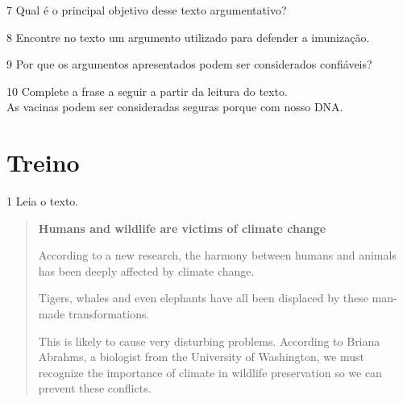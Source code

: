 \num{7} Qual é o principal objetivo desse texto argumentativo?



\num{8} Encontre no texto um argumento utilizado para defender a
imunização.



\num{9} Por que os argumentos apresentados podem ser considerados
confiáveis?



\num{10} Complete a frase a seguir a partir da leitura do texto.\\
As vacinas podem ser consideradas seguras porque \preencher com nosso DNA.


\section{Treino}

\num{1} Leia o texto.

\begin{quote}
\textbf{Humans and wildlife are victims of climate change}

According to a new research, the harmony between humans and animals has been deeply affected by climate change.

Tigers, whales and even elephants have all been displaced by these man-made transformations.

This is likely to cause very disturbing problems. According to Briana Abrahms, a biologist from the University of Washington, we must recognize the importance of climate in wildlife preservation so we can prevent these conflicts.  

\end{quote}



